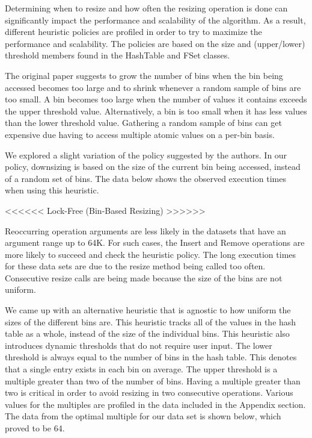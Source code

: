 \documentclass[11pt]{article} %
\begin{document}
Determining when to resize and how often the resizing operation is done can significantly impact the performance and scalability of the algorithm. As a result, different heuristic policies are profiled in order to try to maximize the performance and scalability. The policies are based on the size and (upper/lower) threshold members found in the HashTable and FSet classes.

The original paper suggests to grow the number of bins when the bin being accessed becomes too large and to shrink whenever a random sample of bins are too small. A bin becomes too large when the number of values it contains exceeds the upper threshold value. Alternatively, a bin is too small when it has less values than the lower threshold value. Gathering a random sample of bins can get expensive due having to access multiple atomic values on a per-bin basis.

We explored a slight variation of the policy suggested by the authors. In our policy, downsizing is based on the size of the current bin being accessed, instead of a random set of bins. The data below shows the observed execution times when using this heuristic.


<<<<<< Lock-Free (Bin-Based Resizing) >>>>>>


Reoccurring operation arguments are less likely in the datasets that have an argument range up to 64K. For such cases, the Insert and Remove operations are more likely to succeed and check the heuristic policy. The long execution times for these data sets are due to the resize method being called too often. Consecutive resize calls are being made because the size of the bins are not uniform.

We came up with an alternative heuristic that is agnostic to how uniform the sizes of the different bins are. This heuristic tracks all of the values in the hash table as a whole, instead of the size of the individual bins. This heuristic also introduces dynamic thresholds that do not require user input. The lower threshold is always equal to the number of bins in the hash table. This denotes that a single entry exists in each bin on average. The upper threshold is a multiple greater than two of the number of bins. Having a multiple greater than two is critical in order to avoid resizing in two consecutive operations. Various values for the multiples are profiled in the data included in the Appendix section. The data from the optimal multiple for our data set is shown below, which proved to be 64.
\end{document}
